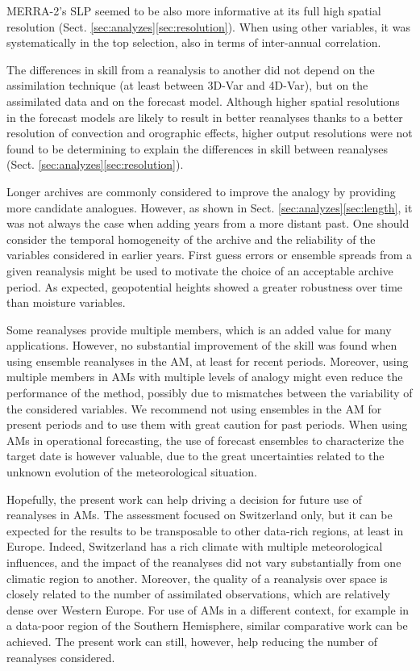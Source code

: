\documentclass{ametsoc}
\begin{document}
MERRA-2's SLP seemed to be also more informative at its full high spatial resolution (Sect. \ref{sec:analyzes}\ref{sec:resolution}). When using other variables, it was systematically in the top selection, also in terms of inter-annual correlation.

The differences in skill from a reanalysis to another did not depend on the assimilation technique (at least between 3D-Var and 4D-Var), but on the assimilated data and on the forecast model. Although higher spatial resolutions in the forecast models are likely to result in better reanalyses thanks to a better resolution of convection and orographic effects, higher output resolutions were not found to be determining to explain the differences in skill between reanalyses (Sect. \ref{sec:analyzes}\ref{sec:resolution}). 

Longer archives are commonly considered to improve the analogy by providing more candidate analogues. However, as shown in Sect. \ref{sec:analyzes}\ref{sec:length}, it was not always the case when adding years from a more distant past. One should consider the temporal homogeneity of the archive and the reliability of the variables considered in earlier years. First guess errors or ensemble spreads from a given reanalysis might be used to motivate the choice of an acceptable archive period. As expected, geopotential heights showed a greater robustness over time than moisture variables. 

Some reanalyses provide multiple members, which is an added value for many applications. However, no substantial improvement of the skill was found when using ensemble reanalyses in the AM, at least for recent periods. Moreover, using multiple members in AMs with multiple levels of analogy might even reduce the performance of the method, possibly due to mismatches between the variability of the considered variables. We recommend not using ensembles in the AM for present periods and to use them with great caution for past periods. When using AMs in operational forecasting, the use of forecast ensembles to characterize the target date is however valuable, due to the great uncertainties related to the unknown evolution of the meteorological situation.

Hopefully, the present work can help driving a decision for future use of reanalyses in AMs. The assessment focused on Switzerland only, but it can be expected for the results to be transposable to other data-rich regions, at least in Europe. Indeed, Switzerland has a rich climate with multiple meteorological influences, and the impact of the reanalyses did not vary substantially from one climatic region to another. Moreover, the quality of a reanalysis over space is closely related to the number of assimilated observations, which are relatively dense over Western Europe. For use of AMs in a different context, for example in a data-poor region of the Southern Hemisphere, similar comparative work can be achieved. The present work can still, however, help reducing the number of reanalyses considered.
\end{document}
